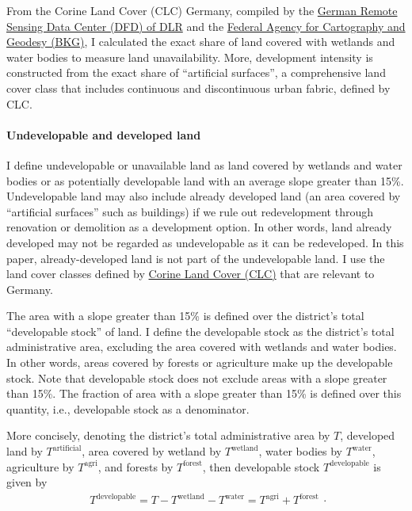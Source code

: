 \documentclass[
  12pt,
]{article}
\begin{document}
From the Corine Land Cover (CLC) Germany, compiled by the \href{https://www.dlr.de/eoc/en/desktopdefault.aspx/tabid-11882/20871_read-48836}{German Remote Sensing Data Center (DFD) of DLR} and the \href{https://www.bkg.bund.de}{Federal Agency for Cartography and Geodesy (BKG)}, I calculated the exact share of land covered with wetlands and water bodies to measure land unavailability. More, development intensity is constructed from the exact share of ``artificial surfaces'', a comprehensive land cover class that includes continuous and discontinuous urban fabric, defined by CLC.

\paragraph{Undevelopable and developed land}\label{constraints}

I define undevelopable or unavailable land as land covered by wetlands and water bodies or as potentially developable land with an average slope greater than 15\%. Undevelopable land may also include already developed land (an area covered by ``artificial surfaces'' such as buildings) if we rule out redevelopment through renovation or demolition as a development option. In other words, land already developed may not be regarded as undevelopable as it can be redeveloped. In this paper, already-developed land is not part of the undevelopable land. I use the land cover classes defined by \href{https://land.copernicus.eu/user-corner/technical-library/corine-land-cover-nomenclature-guidelines/html/index.html}{Corine Land Cover (CLC)} that are relevant to Germany.

The area with a slope greater than 15\% is defined over the district's total ``developable stock'' of land. I define the developable stock as the district's total administrative area, excluding the area covered with wetlands and water bodies. In other words, areas covered by forests or agriculture make up the developable stock. Note that developable stock does not exclude areas with a slope greater than 15\%. The fraction of area with a slope greater than 15\% is defined over this quantity, i.e., developable stock as a denominator.

More concisely, denoting the district's total administrative area by \(T\), developed land by \(T^{\text{artificial}}\), area covered by wetland by \(T^{\text{wetland}}\), water bodies by \(T^{\text{water}}\), agriculture by \(T^{\text{agri}}\), and forests by \(T^{\text{forest}}\), then developable stock \(T^{\text{developable}}\) is given by \[
\begin{aligned}
T^{\text{developable}} = T - T^{\text{wetland}} - T^{\text{water}} = T^{\text{agri}}  + T^{\text{forest}}
\end{aligned}.
\]
\end{document}
